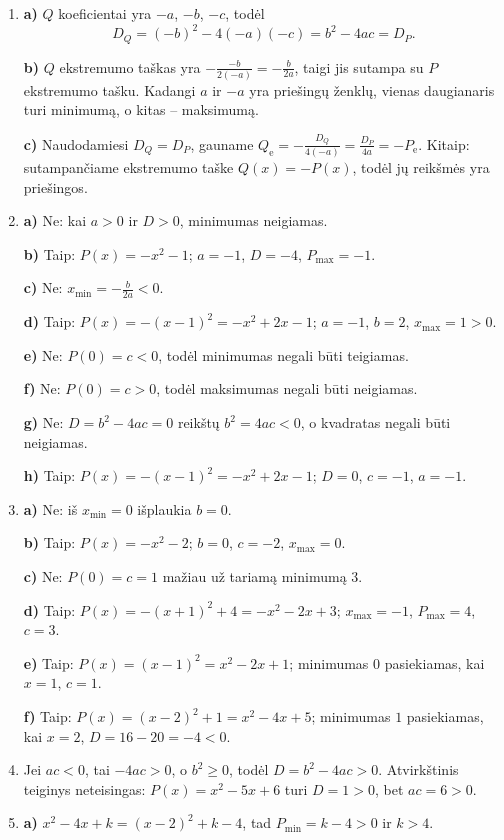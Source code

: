 \documentclass[12pt,a4paper]{article}
\begin{document}
\begin{enumerate}
\textbf{b)} $Q(x)=ax^2+bx+(c+t)$. Koeficientai $a$ ir $b$ nepasikeitė, todėl $x_{\mathrm e}=-\frac{b}{2a}$ lieka tas pats. Naujasis diskriminantas $D_Q=b^2-4a(c+t)=D_P-4at$, tad
\[
Q_{\mathrm e}=-\frac{D_Q}{4a}
=-\frac{D_P-4at}{4a}
=-\frac{D_P}{4a}+t=P_{\mathrm e}+t.
\]
Ekstremumas pakinta $t$, o jo rūšis nekinta, nes nesikeičia $a$ ženklas. Tai matyti ir iš $Q(x)=P(x)+t$.
\item \textbf{a)} $Q$ koeficientai yra $-a$, $-b$, $-c$, todėl
\[
D_Q=(-b)^2-4(-a)(-c)=b^2-4ac=D_P.
\]

\textbf{b)} $Q$ ekstremumo taškas yra $-\frac{-b}{2(-a)}=-\frac{b}{2a}$, taigi jis sutampa su $P$ ekstremumo tašku. Kadangi $a$ ir $-a$ yra priešingų ženklų, vienas daugianaris turi minimumą, o kitas – maksimumą.

\textbf{c)} Naudodamiesi $D_Q=D_P$, gauname $Q_{\mathrm e}=-\frac{D_Q}{4(-a)}=\frac{D_P}{4a}=-P_{\mathrm e}$. Kitaip: sutampančiame ekstremumo taške $Q(x)=-P(x)$, todėl jų reikšmės yra priešingos.
\item \textbf{a)} Ne: kai $a>0$ ir $D>0$, minimumas neigiamas.

\textbf{b)} Taip: $P(x)=-x^2-1$; $a=-1$, $D=-4$, $P_{\max}=-1$.

\textbf{c)} Ne: $x_{\min}=-\frac b{2a}<0$.

\textbf{d)} Taip: $P(x)=-(x-1)^2=-x^2+2x-1$; $a=-1$, $b=2$, $x_{\max}=1>0$.

\textbf{e)} Ne: $P(0)=c<0$, todėl minimumas negali būti teigiamas.

\textbf{f)} Ne: $P(0)=c>0$, todėl maksimumas negali būti neigiamas.

\textbf{g)} Ne: $D=b^2-4ac=0$ reikštų $b^2=4ac<0$, o kvadratas negali būti neigiamas.

\textbf{h)} Taip: $P(x)=-(x-1)^2=-x^2+2x-1$; $D=0$, $c=-1$, $a=-1$.
\item \textbf{a)} Ne: iš $x_{\min}=0$ išplaukia $b=0$.

\textbf{b)} Taip: $P(x)=-x^2-2$; $b=0$, $c=-2$, $x_{\max}=0$.

\textbf{c)} Ne: $P(0)=c=1$ mažiau už tariamą minimumą $3$.

\textbf{d)} Taip: $P(x)=-(x+1)^2+4=-x^2-2x+3$; $x_{\max}=-1$, $P_{\max}=4$, $c=3$.

\textbf{e)} Taip: $P(x)=(x-1)^2=x^2-2x+1$; minimumas $0$ pasiekiamas, kai $x=1$, $c=1$.

\textbf{f)} Taip: $P(x)=(x-2)^2+1=x^2-4x+5$; minimumas $1$ pasiekiamas, kai $x=2$, $D=16-20=-4<0$.
\item Jei $ac<0$, tai $-4ac>0$, o $b^2\ge0$, todėl $D=b^2-4ac>0$. Atvirkštinis teiginys neteisingas: $P(x)=x^2-5x+6$ turi $D=1>0$, bet $ac=6>0$.
\item \textbf{a)} $x^2-4x+k=(x-2)^2+k-4$, tad $P_{\min}=k-4>0$ ir $k>4$.


\end{enumerate}
\end{document}

